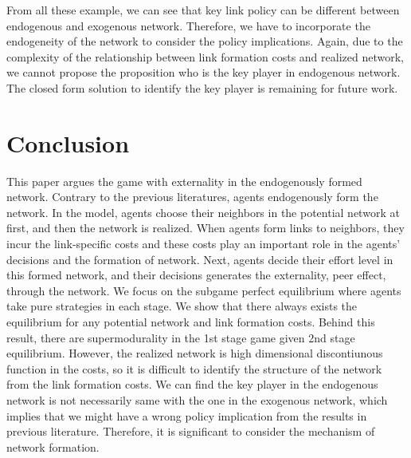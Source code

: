 \documentclass[12pt]{article}
\theoremstyle{definition}
\begin{document}
From all these example, we can see that key link policy can be different between endogenous and exogenous network.
Therefore, we have to incorporate the endogeneity of the network to consider the policy implications.
Again, due to the complexity of the relationship between link formation costs and realized network, we cannot propose the proposition who is the key player in endogenous network.
The closed form solution to identify the key player is remaining for future work.


\section{Conclusion}

This paper argues the game with externality in the endogenously formed network.
Contrary to the previous literatures, agents endogenously form the network.
In the model, agents choose their neighbors in the potential network at first, and then the network is realized.
When agents form links to neighbors, they incur the link-specific costs and these costs play an important role in the agents' decisions and the formation of network.
Next, agents decide their effort level in this formed network, and their decisions generates the externality, peer effect, through the network.
We focus on the subgame perfect equilibrium where agents take pure strategies in each stage.
We show that there always exists the equilibrium for any potential network and link formation costs.
Behind this result, there are supermodurality in the 1st stage game given 2nd stage equilibrium.
However, the realized network is high dimensional discontiunous function in the costs, so it is difficult to identify the structure of the network from the link formation costs.
We can find the key player in the endogenous network is not necessarily same with the one in the exogenous network, which implies that we might have a wrong policy implication from the results in previous literature.
Therefore, it is significant to consider the mechanism of network formation.
\end{document}
